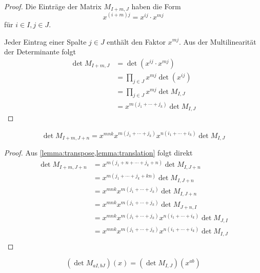 \begin{proof}
    Die Einträge der Matrix $M_{I+m,J}$ haben die Form 
    \begin{equation*}
        x^{(i+m)j} = x^{ij} \cdot x^{mj}
    \end{equation*} für $i\in I, j\in J$.

    Jeder Eintrag einer Spalte $j \in J$ enthält den Faktor $x^{mj}$. Aus der Multilinearität der Determinante folgt
    \begin{align*}
        \det M_{I+m,J}  &= \det (x^{ij} \cdot x^{mj}) \\ 
                        &= \prod_{j \in J} x^{mj} \det (x^{ij}) \\ 
                        &= \prod_{j \in J} x^{mj}  \det M_{I,J} \\
                        &= x^{m(j_1+\cdots +j_k)} \det M_{I,J}
    \end{align*}
\end{proof}

\begin{satz}
    \begin{equation*}
        \det{} M_{I+m,J+n} = x^{mnk} x^{m(j_1 +\cdots + j_k)} x^{n(i_1+\cdots +i_k)} \det{} M_{I,J}
    \end{equation*}
\end{satz}

\begin{proof}
    Aus \cref{lemma:transpose,lemma:translation} folgt direkt
    \begin{align*}
        \det{} M_{I+m,J+n}  &= x^{m(j_1 + n +\cdots + j_k + n)} \det{} M_{I,J+n} \\
                            &= x^{m(j_1 +\cdots + j_k + kn)} \det{} M_{I,J+n} \\
                            &= x^{mnk} x^{m(j_1 +\cdots + j_k)} \det{} M_{I,J+n} \\
                            &= x^{mnk} x^{m(j_1 +\cdots + j_k)} \det{} M_{J+n,I} \\
                            &= x^{mnk} x^{m(j_1 +\cdots + j_k)} x^{n(i_1+\cdots +i_k)} \det{} M_{J,I} \\
                            &= x^{mnk} x^{m(j_1 +\cdots + j_k)} x^{n(i_1+\cdots +i_k)} \det{} M_{I,J} \\
    \end{align*}
\end{proof}

\begin{satz}
    \begin{equation*}
        \left( \det{} M_{aI,bJ} \right) (x) = \left( \det{} M_{I,J} \right) (x^{ab})
    \end{equation*}
\end{satz}

